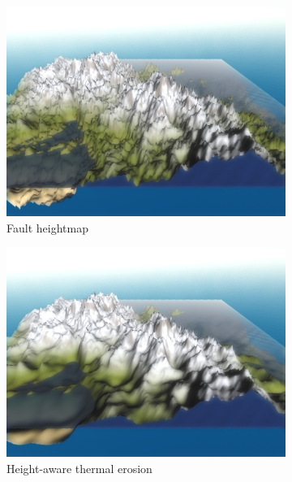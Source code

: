 \documentclass[11pt,a4paper,twoside,openright]{report}
\begin{document}
\begin{figure}[h]
  \centering
  \begin{subfigure}[b]{0.32\textwidth}
    \includegraphics[width=\textwidth]{thermal-50-iterations-before.png}
    \caption{Fault heightmap}
    \label{fig:thermalbefore}
  \end{subfigure}
  \begin{subfigure}[b]{0.32\textwidth}
    \includegraphics[width=\textwidth]{thermal-50-iterations-after1.png}
    \caption{Height-aware thermal erosion}
    \label{fig:thermalafter1}
  \end{subfigure}
  \begin{subfigure}[b]{0.32\textwidth}

\end{subfigure}
\end{figure}
\end{document}
